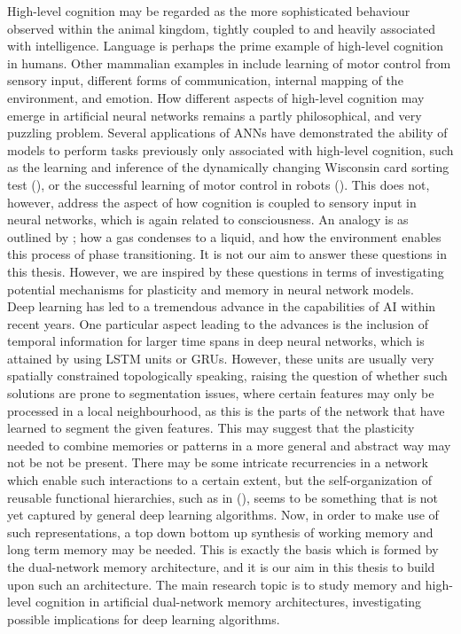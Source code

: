 High-level cognition may be regarded as the more sophisticated behaviour observed within the animal kingdom, tightly coupled to and heavily associated with intelligence. Language is perhaps the prime example of high-level cognition in humans. Other mammalian examples in include learning of motor control from sensory input, different forms of communication, internal mapping of the environment, and emotion.
How different aspects of high-level cognition may emerge in artificial neural networks remains a partly philosophical, and very puzzling problem. Several applications of ANNs have demonstrated the ability of models to perform tasks previously only associated with high-level cognition, such as the learning and inference of the dynamically changing Wisconsin card sorting test (\cite{Maniadakis2012}), or the successful learning of motor control in robots (\cite{Sugita2005, Yamashita2008, Tani2014}). 
This does not, however, address the aspect of how cognition is coupled to sensory input in neural networks, which is again related to consciousness. An analogy is as outlined by \cite{Freeman2003}; how a gas condenses to a liquid, and how the environment enables this process of phase transitioning.
It is not our aim to answer these questions in this thesis. However, we are inspired by these questions in terms of investigating potential mechanisms for plasticity and memory in neural network models.
\\

Deep learning has led to a tremendous advance in the capabilities of AI within recent years. One particular aspect leading to the advances is the inclusion of temporal information for larger time spans in deep neural networks, which is attained by using LSTM units or GRUs. However, these units are usually very spatially constrained topologically speaking, raising the question of whether such solutions are prone to segmentation issues, where certain features may only be processed in a local neighbourhood, as this is the parts of the network that have learned to segment the given features. This may suggest that the plasticity needed to combine memories or patterns in a more general and abstract way may not be not be present. There may be some intricate recurrencies in a network which enable such interactions to a certain extent, but the self-organization of reusable functional hierarchies, such as in (\cite{Tani2014}), seems to be something that is not yet captured by general deep learning algorithms. Now, in order to make use of such representations, a top down bottom up synthesis of working memory and long term memory may be needed. This is exactly the basis which is formed by the dual-network memory architecture, and it is our aim in this thesis to build upon such an architecture. 
The main research topic is to study memory and high-level cognition in artificial dual-network memory architectures, investigating possible implications for deep learning algorithms.

